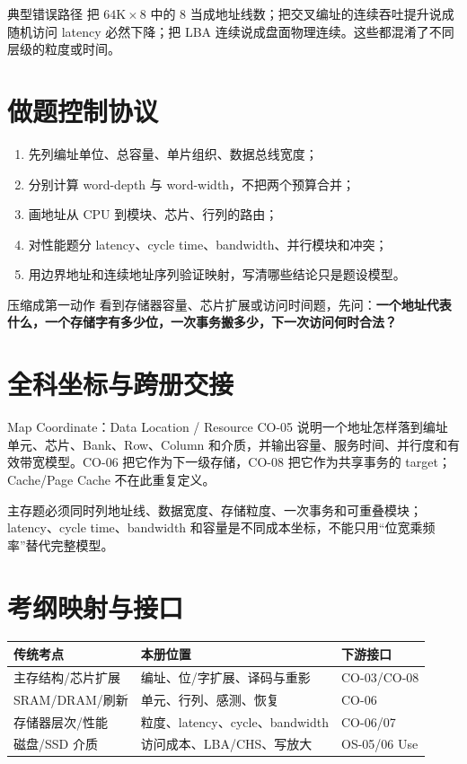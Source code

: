 \documentclass[UTF8,fontset=fandol,11pt,a4paper]{ctexart}
\newcommand{\kw}[1]{\textbf{\color{deep}#1}}\newcommand{\code}[1]{\texttt{#1}}
\begin{document}
\begin{warnbox}{典型错误路径}
把 $64\text{K}\times8$ 中的 8 当成地址线数；把交叉编址的连续吞吐提升说成随机访问 latency 必然下降；把 LBA 连续说成盘面物理连续。这些都混淆了不同层级的粒度或时间。
\end{warnbox}

\section{做题控制协议}
\begin{enumerate}
\item 先列编址单位、总容量、单片组织、数据总线宽度；
\item 分别计算 word-depth 与 word-width，不把两个预算合并；
\item 画地址从 CPU 到模块、芯片、行列的路由；
\item 对性能题分 latency、cycle time、bandwidth、并行模块和冲突；
\item 用边界地址和连续地址序列验证映射，写清哪些结论只是题设模型。
\end{enumerate}

\begin{methodbox}{压缩成第一动作}
看到存储器容量、芯片扩展或访问时间题，先问：\kw{一个地址代表什么，一个存储字有多少位，一次事务搬多少，下一次访问何时合法？}
\end{methodbox}

\section{全科坐标与跨册交接}
\begin{corebox}{Map Coordinate：Data Location / Resource}
CO-05 说明一个地址怎样落到编址单元、芯片、Bank、Row、Column 和介质，并输出容量、服务时间、并行度和有效带宽模型。CO-06 把它作为下一级存储，CO-08 把它作为共享事务的 target；Cache/Page Cache 不在此重复定义。
\end{corebox}
主存题必须同时列地址线、数据宽度、存储粒度、一次事务和可重叠模块；latency、cycle time、bandwidth 和容量是不同成本坐标，不能只用“位宽乘频率”替代完整模型。

\section{考纲映射与接口}
\begin{center}\small
\begin{tabularx}{\linewidth}{L{3.2cm}YY}\toprule
传统考点 & 本册位置 & 下游接口\\\midrule
主存结构/芯片扩展 & 编址、位/字扩展、译码与重影 & CO-03/CO-08\\
SRAM/DRAM/刷新 & 单元、行列、感测、恢复 & CO-06\\
存储器层次/性能 & 粒度、latency、cycle、bandwidth & CO-06/07\\
磁盘/SSD 介质 & 访问成本、LBA/CHS、写放大 & OS-05/06 Use\\
\bottomrule\end{tabularx}\end{center}
\end{document}
